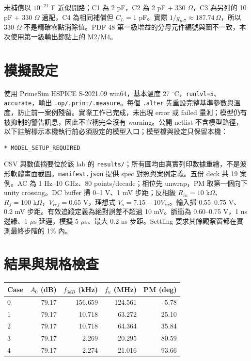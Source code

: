 未補償以 $10^{-21}$ F 近似開路；C1 為 2 pF，C2 為 2 pF + 330 $\Omega$，C3 為另列的 10 pF + 330 $\Omega$ 適配，C4 為相同補償但 $C_L=1$ pF。實際 $1/g_{m7}\approx187.74\,\Omega$，所以 330 $\Omega$ 不是精確零點消除值。PDF 48 第一級增益的分母元件編號與圖不一致，本次使用第一級輸出節點上的 M2/M4。

\section{模擬設定}
使用 PrimeSim HSPICE S-2021.09 win64，基本溫度 27 $^\circ$C，\texttt{runlvl=5}、\texttt{accurate}，輸出 \texttt{.op/.print/.measure}。每個 \texttt{.alter} 先重設完整基準參數與溫度，防止前一案例殘留。實際工作已完成，未出現 error 或 failed 量測；模型仍有被抑制的警告訊息，因此不宣稱完全沒有 warning。公開 netlist 不含模型路徑，以下註解標示本機執行前必須設定的模型入口；模型檔與設定只保留本機：
\begin{verbatim}
* MODEL_SETUP_REQUIRED
\end{verbatim}
CSV 與數值摘要位於該 lab 的 \texttt{results/}；所有圖均由真實列印數據重繪，不是波形軟體畫面截圖。\texttt{manifest.json} 提供 spec 對照與案例定義。五份 deck 共 19 案例。AC 為 1 Hz--10 GHz、80 points/decade；相位先 unwrap，PM 取第一個向下 unity crossing。DC buffer 掃 0--1 V、1 mV 步距；反相級 $R_{in}=10$ k$\Omega$、$R_f=100$ k$\Omega$，$V_{ref}=0.65$ V，理想式 $V_o=7.15-10V_{in}$。輸入掃 0.55--0.75 V、0.2 mV 步距。有效追蹤定義為絕對誤差不超過 10 mV。脈衝為 0.60--0.75 V，1 ns 邊緣、1 $\mu$s 延遲，模擬 5 $\mu$s、最大 0.2 ns 步距。Settling 要求其餘觀察窗都在實測最終步階的 1\% 內。

\section{結果與規格檢查}
\begin{center}\small\begin{tabular}{lrrrr}\toprule
Case & $A_0$ (dB) & $f_{3dB}$ (kHz) & $f_u$ (MHz) & PM (deg) \\ \midrule
0 & 79.17 & 156.659 & 124.561 & -5.78 \\
1 & 79.17 & 10.718 & 63.272 & 25.10 \\
2 & 79.17 & 10.718 & 64.364 & 35.84 \\
3 & 79.17 & 2.269 & 20.295 & 80.59 \\
4 & 79.17 & 2.274 & 21.016 & 93.66 \\
\bottomrule\end{tabular}\end{center}

